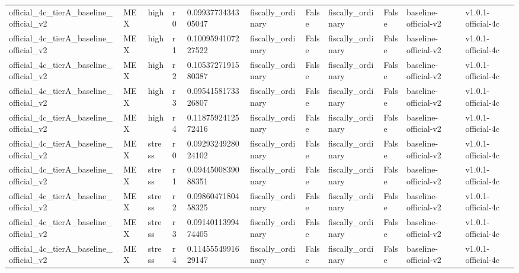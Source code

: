 \begin{table}[!htbp]
\begin{tabular}{lllllllllll}
official\_4c\_tierA\_baseline\_official\_v2 & MEX & high & r0 & 0.0993773434305047 & fiscally\_ordinary & False & fiscally\_ordinary & False & baseline-official-v2 & v1.0.1-official-4c \\
official\_4c\_tierA\_baseline\_official\_v2 & MEX & high & r1 & 0.1009594107227522 & fiscally\_ordinary & False & fiscally\_ordinary & False & baseline-official-v2 & v1.0.1-official-4c \\
official\_4c\_tierA\_baseline\_official\_v2 & MEX & high & r2 & 0.1053727191580387 & fiscally\_ordinary & False & fiscally\_ordinary & False & baseline-official-v2 & v1.0.1-official-4c \\
official\_4c\_tierA\_baseline\_official\_v2 & MEX & high & r3 & 0.0954158173326807 & fiscally\_ordinary & False & fiscally\_ordinary & False & baseline-official-v2 & v1.0.1-official-4c \\
official\_4c\_tierA\_baseline\_official\_v2 & MEX & high & r4 & 0.1187592412572416 & fiscally\_ordinary & False & fiscally\_ordinary & False & baseline-official-v2 & v1.0.1-official-4c \\
official\_4c\_tierA\_baseline\_official\_v2 & MEX & stress & r0 & 0.0929324928024102 & fiscally\_ordinary & False & fiscally\_ordinary & False & baseline-official-v2 & v1.0.1-official-4c \\
official\_4c\_tierA\_baseline\_official\_v2 & MEX & stress & r1 & 0.0944500839088351 & fiscally\_ordinary & False & fiscally\_ordinary & False & baseline-official-v2 & v1.0.1-official-4c \\
official\_4c\_tierA\_baseline\_official\_v2 & MEX & stress & r2 & 0.0986047180458325 & fiscally\_ordinary & False & fiscally\_ordinary & False & baseline-official-v2 & v1.0.1-official-4c \\
official\_4c\_tierA\_baseline\_official\_v2 & MEX & stress & r3 & 0.0914011399474405 & fiscally\_ordinary & False & fiscally\_ordinary & False & baseline-official-v2 & v1.0.1-official-4c \\
official\_4c\_tierA\_baseline\_official\_v2 & MEX & stress & r4 & 0.1145554991629147 & fiscally\_ordinary & False & fiscally\_ordinary & False & baseline-official-v2 & v1.0.1-official-4c \\
\bottomrule
\end{tabular}
\end{table}
